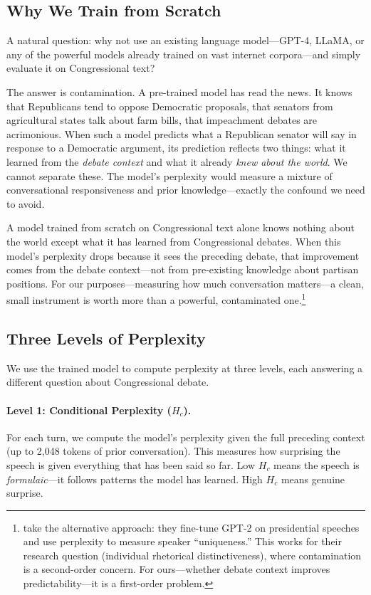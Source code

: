 \documentclass[12pt]{article}
\newcommand{\Hc}{H_c}
\begin{document}
\subsection{Why We Train from Scratch}

A natural question: why not use an existing language model---GPT-4, LLaMA, or any of the powerful models already trained on vast internet corpora---and simply evaluate it on Congressional text?

The answer is contamination. A pre-trained model has read the news. It knows that Republicans tend to oppose Democratic proposals, that senators from agricultural states talk about farm bills, that impeachment debates are acrimonious. When such a model predicts what a Republican senator will say in response to a Democratic argument, its prediction reflects two things: what it learned from the \textit{debate context} and what it already \textit{knew about the world}. We cannot separate these. The model's perplexity would measure a mixture of conversational responsiveness and prior knowledge---exactly the confound we need to avoid.

A model trained from scratch on Congressional text alone knows nothing about the world except what it has learned from Congressional debates. When this model's perplexity drops because it sees the preceding debate, that improvement comes from the debate context---not from pre-existing knowledge about partisan positions. For our purposes---measuring how much conversation matters---a clean, small instrument is worth more than a powerful, contaminated one.\footnote{\citet{zhou2024} take the alternative approach: they fine-tune GPT-2 on presidential speeches and use perplexity to measure speaker ``uniqueness.'' This works for their research question (individual rhetorical distinctiveness), where contamination is a second-order concern. For ours---whether debate context improves predictability---it is a first-order problem.}

\subsection{Three Levels of Perplexity}

We use the trained model to compute perplexity at three levels, each answering a different question about Congressional debate.

\paragraph{Level 1: Conditional Perplexity ($\Hc$).} For each turn, we compute the model's perplexity given the full preceding context (up to 2,048 tokens of prior conversation). This measures how surprising the speech is given everything that has been said so far. Low $\Hc$ means the speech is \textit{formulaic}---it follows patterns the model has learned. High $\Hc$ means genuine surprise.
\end{document}
